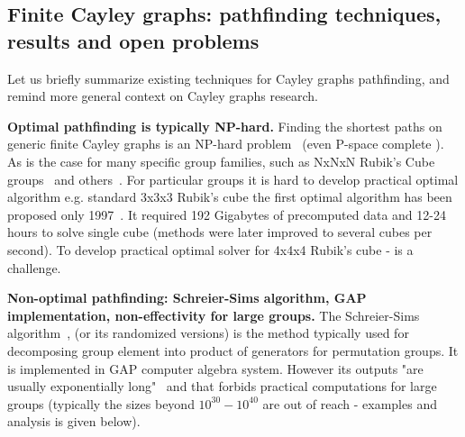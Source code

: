 \documentclass[atmp]{ipart_v1}
\numberwithin{equation}{section}
\theoremstyle{plain}%
\begin{document}


\subsection{Finite Cayley graphs: pathfinding techniques, results and open problems}

Let us briefly summarize existing techniques for Cayley graphs pathfinding, and remind more general context on Cayley graphs research.


{\bf Optimal pathfinding is typically NP-hard.} Finding the shortest paths on generic finite Cayley graphs is an NP-hard problem~\cite{even1981minimum} (even P-space complete \cite{jerrum1985complexity}). As is the case for many specific group families, such as NxNxN Rubik's Cube groups~\cite{demaine2017solving} and others~\cite{bulteau2015pancake, wilson2024cayley}.
For particular groups it is hard to develop practical optimal algorithm e.g. standard 3x3x3 Rubik's cube the first optimal algorithm has been proposed only 1997~\cite{korf1997finding}. It required 192 Gigabytes of precomputed data and 12-24 hours to solve single cube (methods were later improved\cite{Reid1997Optimal,HKociemba2021,Rokicki2014Diameter,Skalskivcube} to several cubes per second). To develop practical optimal solver for 4x4x4 Rubik's cube - is a challenge. 

{\bf Non-optimal pathfinding: Schreier-Sims algorithm, GAP implementation, non-effectivity for large groups.} 
The Schreier-Sims algorithm~\cite{sims1970computational},\cite{knuth1991efficient} (or its randomized versions) is the method typically used for decomposing group element into product of generators for permutation groups. It is implemented in GAP computer algebra system. However its outputs "are usually exponentially long"~\cite{fiat1989planning} and that forbids practical computations for large groups (typically the sizes beyond $10^{30}-10^{40}$ are out of reach - examples and analysis is given below). 
\end{document}
